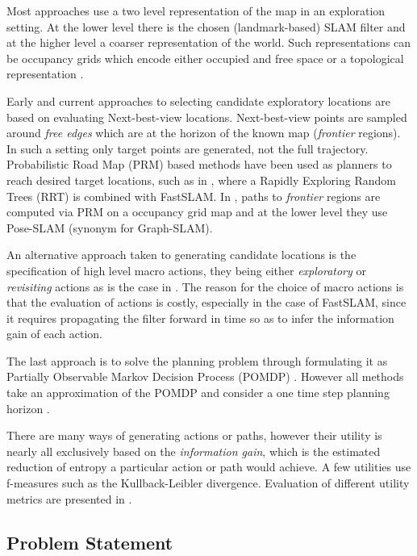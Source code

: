 \documentclass[review]{elsarticle}
\numberwithin{equation}{section}
\begin{document}
Most approaches use a two level representation of the map in an exploration setting. At the lower level
there is the chosen (landmark-based) SLAM filter and at the higher level a coarser representation of the world.
Such representations can be occupancy grids \cite{Thrun_grid_based_1996} which encode either occupied and free space
or a topological representation \cite{Kollar_2008_Exploration_SLAM}.

Early and current approaches to selecting candidate exploratory locations are based on evaluating 
Next-best-view \cite{Navigation_strategires_for_exploring_indoor_environments} locations. Next-best-view points are 
sampled around \textit{free edges} which are at the horizon of the known map (\textit{frontier} regions). 
In such a setting only target points are generated, not the full trajectory. Probabilistic Road Map (PRM) \cite{PRM_1996}
based methods have been used as planners to reach desired target locations, such as in \cite{RRT-SLAM}, where a Rapidly
Exploring Random Trees (RRT) is combined with FastSLAM. In \cite{ActivePosSLAM}, paths to \textit{frontier} regions are computed
via PRM  on a occupancy grid map and at the lower level they use Pose-SLAM (synonym for Graph-SLAM).

An alternative approach taken to generating candidate locations is the specification of high level macro actions, they being either 
\textit{exploratory} or \textit{revisiting} actions as is the case in \cite{stachniss05robotics}. The reason for the choice of macro actions is that the evaluation
of actions is costly, especially in the case of FastSLAM, since it requires propagating the filter 
forward in time so as to infer the information gain of each action.

The last approach is to solve the planning problem through formulating it as  Partially Observable Markov Decision Process (POMDP) \cite{Ross08onlineplanning}. 
However all methods take an approximation of the POMDP and consider a one time step planning horizon \cite[p.37]{GeorgiosLidoris}.

There are many ways of generating actions or paths, however their utility is nearly all exclusively based on the \textit{information gain}, 
which is the estimated reduction of entropy a particular action or path would achieve. A few utilities use f-measures such as the Kullback-Leibler divergence. 
Evaluation of different utility metrics are presented in \cite{Active_SLAM_Uncertainty_compar,tovar_planning,KL_SLAM_exploration_PF}.


\subsection{Problem Statement}
\end{document}
